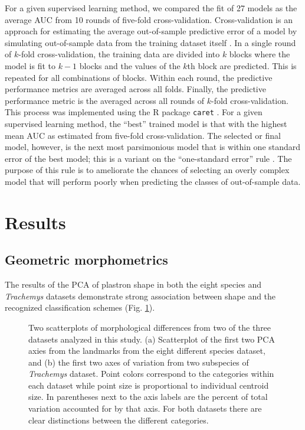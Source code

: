\documentclass[10pt,letterpaper]{article}
\begin{document}
For a given supervised learning method, we compared the fit of 27 models as the average AUC from 10 rounds of five-fold cross-validation. Cross-validation is an approach for estimating the average out-of-sample predictive error of a model by simulating out-of-sample data from the training dataset itself \cite{Hastie2009}. In a single round of \(k\)-fold cross-validation, the training data are divided into \(k\) blocks where the model is fit to \(k - 1\) blocks and the values of the \(k\)th block are predicted. This is repeated for all combinations of blocks. Within each round, the predictive performance metrics are averaged across all folds. Finally, the predictive performance metric is the averaged across all rounds of \(k\)-fold cross-validation. This process was implemented using the R package \texttt{caret} \cite{KuhnMAN2013}. For a given supervised learning method, the ``best'' trained model is that with the highest mean AUC as estimated from five-fold cross-validation. The selected or final model, however, is the next most parsimonious model that is within one standard error of the best model; this is a variant on the ``one-standard error'' rule \cite{Hastie2009}. The purpose of this rule is to ameliorate the chances of selecting an overly complex model that will perform poorly when predicting the classes of out-of-sample data.



\section*{Results}

\subsection*{Geometric morphometrics}

The results of the PCA of plastron shape in both the eight species and \textit{Trachemys} datasets demonstrate strong association between shape and the recognized classification schemes (Fig. \ref{fig:other_pca}).

\begin{figure}[h]
  \centering
  \caption{Two scatterplots of morphological differences from two of the three datasets analyzed in this study. (a) Scatterplot of the first two PCA axies from the landmarks from the eight different species dataset, and (b) the first two axes of variation from two subspecies of \textit{Trachemys} dataset. Point colors correspond to the categories within each dataset while point size is proportional to individual centroid size. In parentheses next to the axis labels are the percent of total variation accounted for by that axis. For both datasets there are clear distinctions between the different categories.}
  \label{fig:other_pca}
\end{figure}
\end{document}
